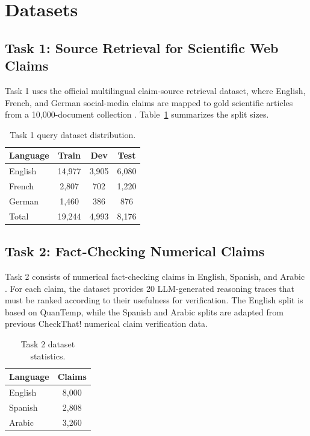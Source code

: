 \documentclass[
]{ceurart}
\begin{document}
\section{Datasets}

\subsection{Task 1: Source Retrieval for Scientific Web Claims}

Task 1 uses the official multilingual claim-source retrieval dataset, where English, French, and German social-media claims are mapped to gold scientific articles from a 10,000-document collection \cite{clef-checkthat:2026:task1}. Table~\ref{tab:task1_datasets} summarizes the split sizes.

\begin{table}[h]
\caption{Task 1 query dataset distribution.}
\label{tab:task1_datasets}
\centering
\begin{tabular}{lccc}
\toprule
Language & Train & Dev & Test \\
\midrule
English & 14,977 & 3,905 & 6,080 \\
French  & 2,807  & 702   & 1,220 \\
German  & 1,460  & 386   & 876 \\
\midrule
Total   & 19,244 & 4,993 & 8,176 \\
\bottomrule
\end{tabular}
\end{table}

\subsection{Task 2: Fact-Checking Numerical Claims}

Task 2 consists of numerical fact-checking claims in English, Spanish, and Arabic \cite{clef-checkthat:2026:task2}. For each claim, the dataset provides 20 LLM-generated reasoning traces that must be ranked according to their usefulness for verification. The English split is based on QuanTemp, while the Spanish and Arabic splits are adapted from previous CheckThat! numerical claim verification data. 

\begin{table}[h]
\caption{Task 2 dataset statistics.}
\label{tab:task2_stats}
\centering
\begin{tabular}{lc}
\toprule
Language & Claims \\
\midrule
English & 8,000 \\
Spanish & 2,808 \\
Arabic & 3,260 \\
\bottomrule
\end{tabular}
\end{table}
\end{document}

